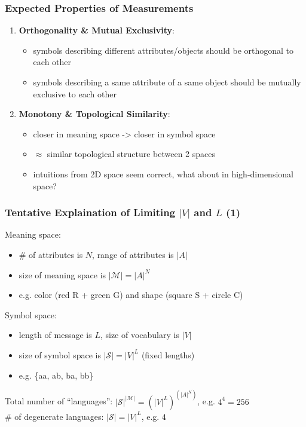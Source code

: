 \documentclass[compress,mathserif,xcolor=dvipsnames,svgnames,aspectratio=43]{beamer}
\begin{document}
\begin{frame}[c]
  \frametitle{Expected Properties of Measurements}
  \begin{enumerate}
    \item \textbf{Orthogonality \& Mutual Exclusivity}:
            \begin{itemize}
              \item symbols describing different attributes/objects should be orthogonal to each other
              \item symbols describing a same attribute of a same object should be mutually exclusive to each other
            \end{itemize}
    \item \textbf{Monotony \& Topological Similarity}:
            \begin{itemize}
              \item closer in meaning space -> closer in symbol space 
              \item $\approx$ similar topological structure between 2 spaces
              \item intuitions from 2D space seem correct, what about in high-dimensional space?
            \end{itemize}
  \end{enumerate}
\end{frame}

\begin{frame}[c]
  \frametitle{Tentative Explaination of Limiting $|V|$ and $L$ (1)}
  Meaning space:
  \begin{itemize}
    \item \# of attributes is $N$, range of attributes is $|A|$
    \item size of meaning space is $|\mathcal{M}| = |A|^N$
    \item e.g. color (red R + green G) and shape (square S + circle C)
  \end{itemize}

  Symbol space:
  \begin{itemize}
    \item length of message is $L$, size of vocabulary is $|V|$
    \item size of symbol space is $|\mathcal{S}| = |V|^L$ (fixed lengths)
    \item e.g. \{aa, ab, ba, bb\}
  \end{itemize}
  Total number of ``languages'': $|\mathcal{S}|^{|\mathcal{M}|} = {(|V|^L)}^{(|A|^N)}$, e.g. $4^4=256$ \\
  \# of degenerate languages: $|\mathcal{S}| = |V|^L$, e.g. $4$
\end{frame}
\end{document}
